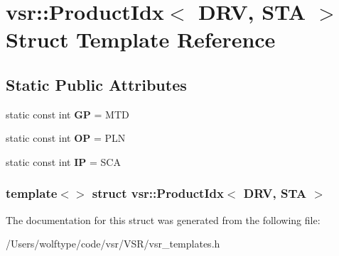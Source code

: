 \hypertarget{structvsr_1_1_product_idx_3_01_d_r_v_00_01_s_t_a_01_4}{\section{vsr\-:\-:Product\-Idx$<$ D\-R\-V, S\-T\-A $>$ Struct Template Reference}
\label{structvsr_1_1_product_idx_3_01_d_r_v_00_01_s_t_a_01_4}
}
\subsection*{Static Public Attributes}
\begin{DoxyCompactItemize}
\item 
\hypertarget{structvsr_1_1_product_idx_3_01_d_r_v_00_01_s_t_a_01_4_a900af8496c7faf1fc53d8c497b445e30}{static const int {\bfseries G\-P} = M\-T\-D}\label{structvsr_1_1_product_idx_3_01_d_r_v_00_01_s_t_a_01_4_a900af8496c7faf1fc53d8c497b445e30}

\item 
\hypertarget{structvsr_1_1_product_idx_3_01_d_r_v_00_01_s_t_a_01_4_a19d8a0aca724c3db9b4e9a7d22e9cdaa}{static const int {\bfseries O\-P} = P\-L\-N}\label{structvsr_1_1_product_idx_3_01_d_r_v_00_01_s_t_a_01_4_a19d8a0aca724c3db9b4e9a7d22e9cdaa}

\item 
\hypertarget{structvsr_1_1_product_idx_3_01_d_r_v_00_01_s_t_a_01_4_af5de680853c16bb417f48da131d245e5}{static const int {\bfseries I\-P} = S\-C\-A}\label{structvsr_1_1_product_idx_3_01_d_r_v_00_01_s_t_a_01_4_af5de680853c16bb417f48da131d245e5}

\end{DoxyCompactItemize}
\subsubsection*{template$<$$>$ struct vsr\-::\-Product\-Idx$<$ D\-R\-V, S\-T\-A $>$}



The documentation for this struct was generated from the following file\-:\begin{DoxyCompactItemize}
\item 
/\-Users/wolftype/code/vsr/\-V\-S\-R/vsr\-\_\-templates.\-h\end{DoxyCompactItemize}
